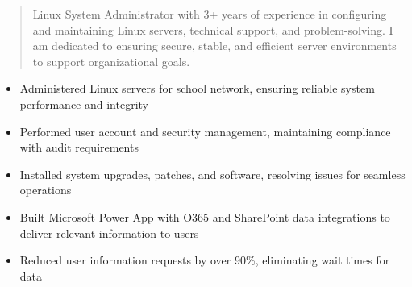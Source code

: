 



\makecvheader

\begin{quote}
  \noindent
  Linux System Administrator with 3+ years of experience in configuring and maintaining Linux servers, technical support, and problem-solving. I am dedicated to ensuring secure, stable, and efficient server environments to support organizational goals.
\end{quote}

\par\smallskip
\noindent
\begin{minipage}{20cm}
  \begin{minipage}{9.75cm}
    \begin{itemize}
      \item Administered Linux servers for school network, ensuring reliable system performance and integrity
      \item Performed user account and security management, maintaining compliance with audit requirements
      \item Installed system upgrades, patches, and software, resolving issues for seamless operations
    \end{itemize}
  \end{minipage}
  \hfill
  \begin{minipage}{9.75cm}
    \begin{itemize}
      \item Built Microsoft Power App with O365 and SharePoint data integrations to deliver relevant information to users
      \item Reduced user information requests by over 90\%, eliminating wait times for data
    \end{itemize}
  \end{minipage}
\end{minipage}
\par\smallskip
\divider


